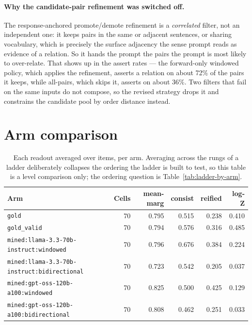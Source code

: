 \documentclass[11pt]{article}
\begin{document}
\paragraph{Why the candidate-pair refinement was switched off.} The response-anchored promote/demote refinement is a \emph{correlated} filter, not an independent one: it keeps pairs in the same or adjacent sentences, or sharing vocabulary, which is precisely the surface adjacency the sense prompt reads as evidence of a relation. So it hands the prompt the pairs the prompt is most likely to over-relate. That shows up in the assert rates --- the forward-only windowed policy, which applies the refinement, asserts a relation on about 72\% of the pairs it keeps, while all-pairs, which skips it, asserts on about 36\%. Two filters that fail on the same inputs do not compose, so the revised strategy drops it and constrains the candidate pool by order distance instead.

\section{Arm comparison}\label{sec:arms}

\begin{table}[htbp]
\centering
\small
\caption{Each readout averaged over items, per arm. Averaging across the rungs of a ladder deliberately collapses the ordering the ladder is built to test, so this table is a level comparison only; the ordering question is Table~\ref{tab:ladder-by-arm}.}
\label{tab:policy-lcs}
\begin{tabular}{lrrrrr}
\toprule
Arm & Cells & \textbf{mean-marg} & \textbf{consist} & \textbf{reified} & \textbf{log-Z} \\
\midrule
\texttt{gold} & 70 & 0.795 & 0.515 & 0.238 & 0.410 \\
\texttt{gold\_valid} & 70 & 0.794 & 0.576 & 0.316 & 0.485 \\
\texttt{mined:llama-3.3-70b-instruct:windowed} & 70 & 0.796 & 0.676 & 0.384 & 0.224 \\
\texttt{mined:llama-3.3-70b-instruct:bidirectional} & 70 & 0.723 & 0.542 & 0.205 & 0.037 \\
\texttt{mined:gpt-oss-120b-a100:windowed} & 70 & 0.825 & 0.500 & 0.425 & 0.129 \\
\texttt{mined:gpt-oss-120b-a100:bidirectional} & 70 & 0.808 & 0.462 & 0.251 & 0.033 \\
\bottomrule
\end{tabular}
\end{table}
\end{document}
